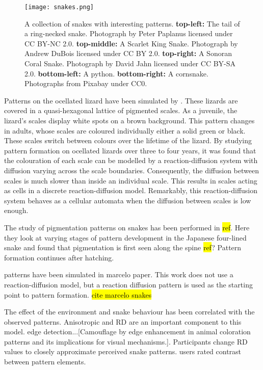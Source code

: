 
\begin{figure}[hb]
	\centering
	\texttt{[image: snakes.png]}
	\caption{A collection of snakes with interesting patterns. \textbf{top-left:} The tail of a ring-necked snake. Photograph by Peter Paplanus licensed under CC BY-NC 2.0. \textbf{top-middle:} A Scarlet King Snake. Photograph by Andrew DuBois licensed under CC BY 2.0. \textbf{top-right:} A Sonoran Coral Snake. Photograph by David Jahn licensed under CC BY-SA 2.0. \textbf{bottom-left:} A python. \textbf{bottom-right:} A cornsnake. Photographs from Pixabay under CC0.}
	\label{fig:realSnakePatterns}
\end{figure}

Patterns on the ocellated lizard have been simulated by \cite{manukyan2017}. These lizards are covered in a quasi-hexagonal lattice of pigmented scales. As a juvenile, the lizard's scales display white spots on a brown background. This pattern changes in adults, whose scales are coloured individually either a solid green or black. These scales switch between colours over the lifetime of the lizard. By studying pattern formation on ocellated lizards over three to four years, it was found that the colouration of each scale can be modelled by a reaction-diffusion system with diffusion varying across the scale boundaries. Consequently, the diffusion between scales is much slower than inside an individual scale. This results in scales acting as cells in a discrete reaction-diffusion model. Remarkably, this reaction-diffusion system behaves as a cellular automata when the diffusion between scales is low enough.

The study of pigmentation patterns on snakes has been performed in \hl{ref}. Here they look at varying stages of pattern development in the Japanese four-lined snake and found that pigmentation is first seen along the spine \hl{ref}? Pattern formation continues after hatching.

patterns have been simulated in marcelo paper. This work does not use a reaction-diffusion model, but a reaction diffusion pattern is used as the starting point to pattern formation. \hl{cite marcelo snakes}

The effect of the environment and snake behaviour has been correlated with the observed patterns. Anisotropic and RD are an important component to this model. edge detection...[Camouflage by edge enhancement in animal coloration patterns and its implications for visual mechanisms.]. Participants change RD values to closely approximate perceived snake patterns. users rated contrast between pattern elements.

